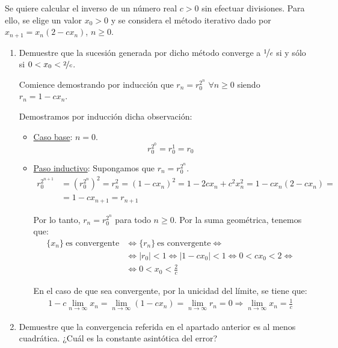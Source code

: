 \begin{ejercicio}\label{ej:1.1.2}
    Se quiere calcular el inverso de un número real $c > 0$ sin efectuar divisiones. Para ello, se elige un valor $x_0 > 0$ y se considera el método iterativo dado por $x_{n+1} = x_n(2 - cx_n)$, $n \geq 0$.
    \begin{enumerate}
        \item Demuestre que la sucesión generada por dicho método converge a $\nicefrac{1}{c}$ si y sólo si $0 < x_0 < \nicefrac{2}{c}$.
        \begin{observacion}
            Comience demostrando por inducción que $r_n = r^{2^n}_0$ $\forall n \geq 0$ siendo $r_n = 1 - cx_n$.
        \end{observacion} 

        Demostramos por inducción dicha observación:
        \begin{itemize}
            \item \ul{Caso base}: $n=0$.
            \begin{equation*}
                r_0^{2^0}=r_0^1=r_0
            \end{equation*}

            \item \ul{Paso inductivo}: Supongamos que $r_n=r_0^{2^n}$.
            \begin{align*}
                r_0^{2^{n+1}}&=\left(r_0^{2^n}\right)^2=r_n^2=\left(1-cx_n\right)^2
                =1-2cx_n+c^2x_n^2
                = 1-cx_n\left(2-cx_n\right)
                =\\&= 1-cx_{n+1}=r_{n+1}
            \end{align*}

            Por lo tanto, $r_n=r_0^{2^n}$ para todo $n\geq 0$.
            Por la suma geométrica, tenemos que:
            \begin{align*}
                \{x_n\}\ \text{es convergente} &\iff \{r_n\}\ \text{es convergente} \iff\\&\iff |r_0|<1 \iff |1-cx_0|<1 \iff 0<cx_0<2\iff\\&\iff 0<x_0<\frac{2}{c}
            \end{align*}

            En el caso de que sea convergente, por la unicidad del límite, se tiene que:
            \begin{align*}
                1-c\lim_{n\to \infty}x_n
                =\lim_{n\to \infty} \left(1-cx_n\right)=
                \lim_{n\to \infty}r_n=0
                \Longrightarrow
                \lim_{n\to \infty}x_n = \frac{1}{c}
            \end{align*}
        \end{itemize}
        \item Demuestre que la convergencia referida en el apartado anterior es al menos cuadrática. ¿Cuál es la constante asintótica del error?
        

\end{enumerate}
\end{ejercicio}
